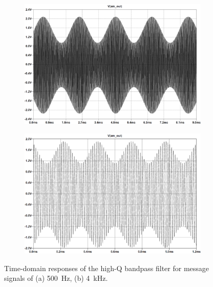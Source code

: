 \documentclass[11pt,letter,notitlepage]{article}
\begin{document}
	\clearpage
	\begin{figure}[h]	
		\centering
		\begin{subfigure}{\linewidth}
			\centering
			\includegraphics[width=0.9\linewidth]{highqbpf/highqt500img}
			\caption{}
			\label{fig:highqt500img}
		\end{subfigure}
		\vspace{1em}
			
		\begin{subfigure}{\linewidth}
			\centering
			\includegraphics[width=0.9\linewidth]{highqbpf/highqt4kimg}
			\caption{}
			\label{fig:highqt4kimg}
		\end{subfigure}

		\caption{Time-domain responses of the high-Q bandpass filter for message signals of (a) \SI{500}{\Hz}, (b) \SI{4}{\kHz}.}
		\label{fig:highqt}
	\end{figure}
\end{document}
